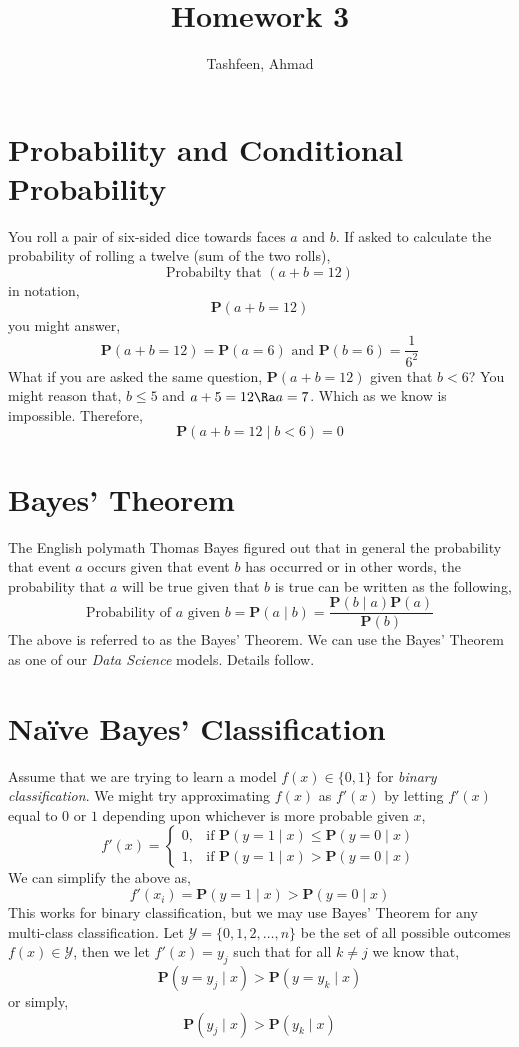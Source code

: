 \documentclass{homework}
\author{Tashfeen, Ahmad}
\title{Homework 3}
\renewcommand\P{\mathbf{P}}
\newcommand\Y{\mathcal{Y}}
\begin{document}
 \maketitle

\section{Probability and Conditional Probability}

You roll a pair of six-sided dice towards faces $a$ and $b$. If asked
to calculate the probability of rolling a twelve (sum of the two
rolls),
\[
  \text{Probabilty that }(a+b=12)
\]
in notation,
\[
  \P(a+b=12)
\]
you might answer,
\[
  \P(a+b=12) = \P(a = 6) \text{ and } \P(b = 6) = \frac{1}{6^2}
\]
What if you are asked the same question, $\P(a+b=12)$ given that
$b < 6$? You might reason that, $b \leq 5$ and $a+5=12 \Ra a =
  7$. Which as we know is impossible. Therefore,
\[
  \P(a+b=12 \mid b < 6) = 0
\]

\section{Bayes' Theorem}

The English polymath Thomas Bayes figured out that in general the
probability that event $a$ occurs given that event $b$ has occurred or
in other words, the probability that $a$ will be true given that $b$
is true can be written as the following,
\[
  \text{Probability of } a \text{ given } b =
  \P(a \mid b) = \frac{\P(b \mid a)\P(a)}{\P(b)}
\]
The above is referred to as the Bayes' Theorem. We can use the Bayes'
Theorem as one of our \textit{Data Science} models. Details follow.

\section{Na\"ive Bayes' Classification}

Assume that we are trying to learn a model $f(x) \in \{0, 1\}$ for
\textit{binary classification}. We might try approximating $f(x)$ as
$f'(x)$ by letting $f'(x)$ equal to $0$ or $1$ depending upon
whichever is more probable given $x$,
\[
  f'(x) =
  \begin{cases}
    0, & \text{if } \P(y=1 \mid x) \leq \P(y=0 \mid x) \\
    1, & \text{if } \P(y=1 \mid x) > \P(y=0 \mid x)
  \end{cases}
\]
We can simplify the above as,
\[
  f'(x_i) = \P(y=1 \mid x) > \P(y=0 \mid x)
\]
This works for binary classification, but we may use Bayes' Theorem
for any multi-class classification. Let $\Y = \{0, 1, 2,\hdots, n\}$
be the set of all possible outcomes \ie $f(x) \in \Y$, then we let
$f'(x) = y_j$ such that for all $k \neq j$ we know that,
\[
  \P(y=y_j \mid x) >  \P(y=y_k \mid x)
\]
or simply,
\[
  \P(y_j \mid x) >  \P(y_k \mid x)
\]
\end{document}
